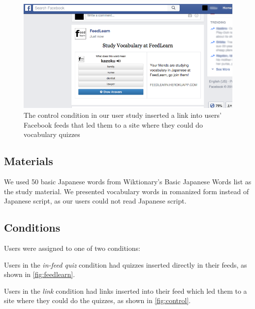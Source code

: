 \documentclass{sigchi}
\begin{document}

\begin{figure}
\centering
\includegraphics[width=1.0\columnwidth]{feedlearn-link-screenshot}
\caption{The control condition in our user study inserted a link into users' Facebook feeds that led them to a site where they could do vocabulary quizzes}
\label{fig:control}
\end{figure}

\subsection{Materials}

We used 50 basic Japanese words from Wiktionary's Basic Japanese Words list as the study material. We presented vocabulary words in romanized form instead of Japanese script, as our users could not read Japanese script.


\subsection{Conditions}

Users were assigned to one of two conditions:

\begin{compactitem}
\item Users in the \textit{in-feed quiz} condition had quizzes inserted directly in their feeds, as shown in \autoref{fig:feedlearn}.
\item Users in the \textit{link} condition had links inserted into their feed which led them to a site where they could do the quizzes, as shown in \autoref{fig:control}.
\end{compactitem}
\end{document}
